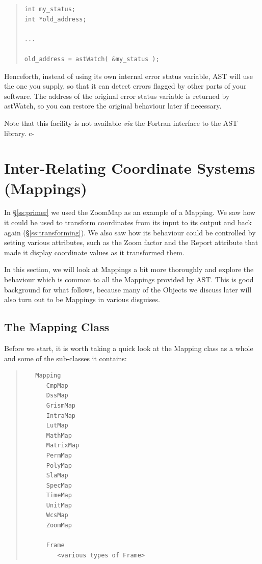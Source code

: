 \documentclass[twoside,11pt]{article}
\newcommand{\secref}[1]{\S\ref{#1}}
\newcommand{\secref}[1]{\ref{#1}}
\begin{document}
\begin{quote}
\small
\begin{verbatim}
int my_status;
int *old_address;

...

old_address = astWatch( &my_status );
\end{verbatim}
\normalsize
\end{quote}

Henceforth, instead of using its own internal error status variable,
AST will use the one you supply, so that it can detect errors flagged
by other parts of your software. The address of the original error
status variable is returned by astWatch, so you can restore the
original behaviour later if necessary.

Note that this facility is not available {\em{via}} the Fortran
interface to the AST library.
c-

\cleardoublepage
\section{\label{ss:mappings}Inter-Relating Coordinate Systems (Mappings)}

In \secref{ss:primer} we used the ZoomMap as an example of a
Mapping. We saw how it could be used to transform coordinates from its
input to its output and back again (\secref{ss:transforming}). We also
saw how its behaviour could be controlled by setting various
attributes, such as the Zoom factor and the Report attribute that made
it display coordinate values as it transformed them.

In this section, we will look at Mappings a bit more thoroughly and
explore the behaviour which is common to all the Mappings provided by
AST.  This is good background for what follows, because many of the
Objects we discuss later will also turn out to be Mappings in various
disguises.

\subsection{\label{ss:mappingclass}The Mapping Class}

Before we start, it is worth taking a quick look at the Mapping class
as a whole and some of the sub-classes it contains:

\begin{quote}
\begin{verbatim}
   Mapping
      CmpMap
      DssMap
      GrismMap
      IntraMap
      LutMap
      MathMap
      MatrixMap
      PermMap
      PolyMap
      SlaMap
      SpecMap
      TimeMap
      UnitMap
      WcsMap
      ZoomMap

      Frame
         <various types of Frame>
\end{verbatim}
\end{quote}
\end{document}

